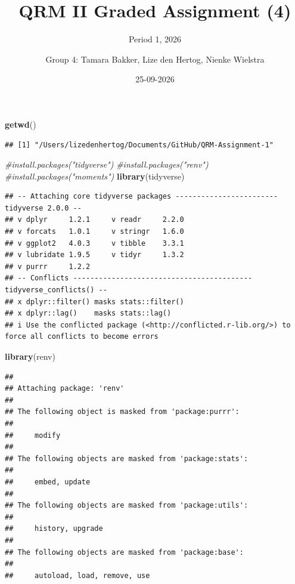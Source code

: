 \documentclass[
]{article}
\title{QRM II Graded Assignment (4)}
\subtitle{Period 1, 2026}
\author{Group 4: Tamara Bakker, Lize den Hertog, Nienke Wielstra}
\date{25-09-2026}
\newenvironment{Shaded}{\begin{snugshade}}{\end{snugshade}}
\newcommand{\CommentTok}[1]{\textcolor[rgb]{0.56,0.35,0.01}{\textit{#1}}}
\newcommand{\FunctionTok}[1]{\textcolor[rgb]{0.13,0.29,0.53}{\textbf{#1}}}
\newcommand{\NormalTok}[1]{#1}
\begin{document}
\maketitle

\begin{Shaded}
\begin{Highlighting}[]
\FunctionTok{getwd}\NormalTok{()}
\end{Highlighting}
\end{Shaded}

\begin{verbatim}
## [1] "/Users/lizedenhertog/Documents/GitHub/QRM-Assignment-1"
\end{verbatim}

\begin{Shaded}
\begin{Highlighting}[]
\CommentTok{\#install.packages("tidyverse")}
\CommentTok{\#install.packages("renv")}
\CommentTok{\#install.packages("moments")}
\FunctionTok{library}\NormalTok{(tidyverse)}
\end{Highlighting}
\end{Shaded}

\begin{verbatim}
## -- Attaching core tidyverse packages ------------------------ tidyverse 2.0.0 --
## v dplyr     1.2.1     v readr     2.2.0
## v forcats   1.0.1     v stringr   1.6.0
## v ggplot2   4.0.3     v tibble    3.3.1
## v lubridate 1.9.5     v tidyr     1.3.2
## v purrr     1.2.2     
## -- Conflicts ------------------------------------------ tidyverse_conflicts() --
## x dplyr::filter() masks stats::filter()
## x dplyr::lag()    masks stats::lag()
## i Use the conflicted package (<http://conflicted.r-lib.org/>) to force all conflicts to become errors
\end{verbatim}

\begin{Shaded}
\begin{Highlighting}[]
\FunctionTok{library}\NormalTok{(renv)}
\end{Highlighting}
\end{Shaded}

\begin{verbatim}
## 
## Attaching package: 'renv'
## 
## The following object is masked from 'package:purrr':
## 
##     modify
## 
## The following objects are masked from 'package:stats':
## 
##     embed, update
## 
## The following objects are masked from 'package:utils':
## 
##     history, upgrade
## 
## The following objects are masked from 'package:base':
## 
##     autoload, load, remove, use
\end{verbatim}
\end{document}
